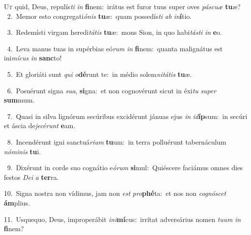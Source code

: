 \lettrine{\initial\textcolor{\initialcolor}{U}}{t} quid, Deus, repulís\textit{ti} \textit{in} \textbf{fi}\-nem:~\star irátus est furor tuus super oves \textit{pás}\-\textit{cu}\textit{æ} \textbf{tu}\-æ?\\
{\numbfont\textcolor{\numbcolor}{~2.}}~Memor esto congregati\-\textit{ó}\-\textit{nis} \textbf{tu}\-æ:~\star quam possedís\textit{ti} \textit{ab} \textit{in}\-\textbf{í}tio.\par
{\numbfont\textcolor{\numbcolor}{~3.}}~Redemísti virgam heredi\-\textit{tá}\-\textit{tis} \textbf{tu}\-æ:~\star mons Sion, in quo habi\-\textit{tás}\-\textit{ti} \textit{in} \textbf{e}\-o.\par
{\numbfont\textcolor{\numbcolor}{~4.}}~Leva manus tuas in supérbias eó\textit{rum} \textit{in} \textbf{fi}\-nem:~\star quanta malignátus est ini\-\textit{mí}\-\textit{cus} \textit{in} \textbf{sanc}\-to!\par
{\numbfont\textcolor{\numbcolor}{~5.}}~Et gloriáti sunt \textit{qui} \textit{o}\-\textbf{dé}runt te:~\star in médio solem\-\textit{ni}\-\textit{tá}\textit{tis} \textbf{tu}\-æ.\par
{\numbfont\textcolor{\numbcolor}{~6.}}~Posuérunt signa \textit{su}\-\textit{a}, \textbf{si}\-gna:~\star et non cognovérunt sicut in éxi\textit{tu} \textit{su}\-\textit{per} \textbf{sum}\-mum.\par
{\numbfont\textcolor{\numbcolor}{~7.}}~Quasi in silva lignórum secúribus excidérunt jánuas ejus \textit{in} \textit{id}\-\textbf{íp}sum:~\star in secúri et áscia de\-\textit{je}\-\textit{cé}\textit{runt} \textbf{e}\-am.\par
{\numbfont\textcolor{\numbcolor}{~8.}}~Incendérunt igni sanctuá\-\textit{ri}\-\textit{um} \textbf{tu}\-um:~\star in terra polluérunt tabernáculum \textit{nó}\-\textit{mi}\textit{nis} \textbf{tu}\-i.\par
{\numbfont\textcolor{\numbcolor}{~9.}}~Dixérunt in corde suo cognátio e\-\textit{ó}\-\textit{rum} \textbf{si}\-mul:~\star Quiéscere faciámus omnes dies festos \textit{De}\-\textit{i} \textit{a} \textbf{ter}\-ra.\par
{\numbfont\textcolor{\numbcolor}{10.}}~Signa nostra non vídimus, jam non \textit{est} \textit{pro}\-\textbf{phé}ta:~\star et nos non \textit{co}\-\textit{gnó}\textit{scet} \textbf{ám}\-plius.\par
{\numbfont\textcolor{\numbcolor}{11.}}~Usquequo, Deus, improperábit \textit{in}\-\textit{i}\textbf{mí}cus:~\star irrítat adversárius nomen \textit{tu}\-\textit{um} \textit{in} \textbf{fi}\-nem?\par
